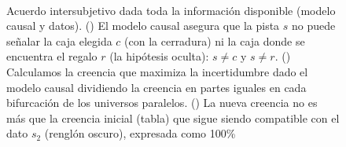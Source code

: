 \documentclass[a4paper,11pt]{book}
\theoremstyle{definition}
\begin{document}
\begin{figure}[ht!]
\begin{subfigure}[b]{0.34\textwidth}
  \phantom{--}\\[0.1cm]


\caption{}
\label{fig:f3}
\end{subfigure}
\caption{
Acuerdo intersubjetivo dada toda la información disponible (modelo causal y datos).
%
() El modelo causal asegura que la pista $s$ no puede señalar la caja elegida $c$ (con la cerradura) ni la caja donde se encuentra el regalo $r$ (la hipótesis oculta): $s\neq c$ y $s\neq r$.
%
() Calculamos la creencia que maximiza la incertidumbre dado el modelo causal dividiendo la creencia en partes iguales en cada bifurcación de los universos paralelos.
%
() La nueva creencia no es más que la creencia inicial (tabla) que sigue siendo compatible con el dato $s_2$ (renglón oscuro), expresada como 100\%
}
\label{fig:monty_hall}
\end{figure}

\end{document}
